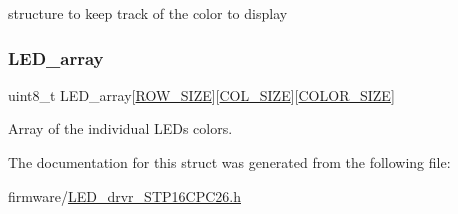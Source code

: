 structure to keep track of the color to display 

\hypertarget{struct_l_e_d__drvr__t_a7f01ed87a74212d270cae32130977184}{}\label{struct_l_e_d__drvr__t_a7f01ed87a74212d270cae32130977184} 
\subsubsection{\texorpdfstring{L\+E\+D\+\_\+array}{LED\_array}}
{\footnotesize\ttfamily uint8\+\_\+t L\+E\+D\+\_\+array\mbox{[}\hyperlink{_l_e_d__drvr___s_t_p16_c_p_c26_8h_aa4d030604a90c8d019d90fc721900d63}{R\+O\+W\+\_\+\+S\+I\+ZE}\mbox{]}\mbox{[}\hyperlink{_l_e_d__drvr___s_t_p16_c_p_c26_8h_a99468544016f0abb855e6415c629ec29}{C\+O\+L\+\_\+\+S\+I\+ZE}\mbox{]}\mbox{[}\hyperlink{_l_e_d__drvr___s_t_p16_c_p_c26_8h_a68a80be4e42506b0127b8559bc6662b0}{C\+O\+L\+O\+R\+\_\+\+S\+I\+ZE}\mbox{]}}



Array of the individual L\+E\+Ds colors. 



The documentation for this struct was generated from the following file\+:\begin{DoxyCompactItemize}
\item 
firmware/\hyperlink{_l_e_d__drvr___s_t_p16_c_p_c26_8h}{L\+E\+D\+\_\+drvr\+\_\+\+S\+T\+P16\+C\+P\+C26.\+h}\end{DoxyCompactItemize}
